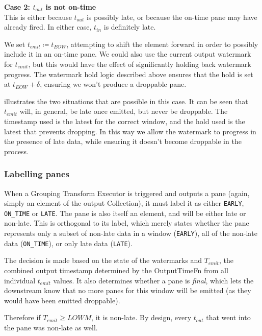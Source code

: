 \textbf{Case 2: $t_{\mathit{out}}$ is not on-time}\\
This is either because $t_{\mathit{out}}$ is possibly late, or because the on-time pane may have already fired.
In either case, $t_{\mathit{in}}$ is definitely late.

We set $t_{\mathit{emit}} \coloneq t_{\mathit{EOW}}$, attempting to shift the element forward in order to possibly include it in an on-time pane.
We could also use the current output watermark for $t_{\mathit{emit}}$, but this would have the effect of significantly holding back watermark progress.
The watermark hold logic described above ensures that the hold is set at $t_{\mathit{EOW}} + \delta$, ensuring we won't produce a droppable pane.


 illustrates the two situations that are possible in this case. It can be seen that $t_{\mathit{emit}}$ will, in general, be late once emitted, but never be droppable. 
The timestamp used is the latest for the correct window, and the hold used is the latest that prevents dropping.
In this way we allow the watermark to progress in the presence of late data, while ensuring it doesn't become droppable in the process.

\subsubsection{Labelling panes}

When a Grouping Transform Executor is triggered and outputs a pane (again, simply an element of the output Collection), it must label it as either \verb|EARLY|, \verb|ON_TIME| or \verb|LATE|.
The pane is also itself an element, and will be either late or non-late.
This is orthogonal to its label, which merely states whether the pane represents only a subset of non-late data in a window (\verb|EARLY|), all of the non-late data (\verb|ON_TIME|), or only late data (\verb|LATE|).

The decision is made based on the state of the watermarks and $T_{\mathit{emit}}$, the combined output timestamp determined by the OutputTimeFn from all individual $t_{\mathit{emit}}$ values.
It also determines whether a pane is \emph{final}, which lets the downstream know that no more panes for this window will be emitted (as they would have been emitted droppable).


Therefore if $T_{\mathit{emit}} \geq \mathit{LOWM}$, it is non-late.
By design, every $t_{\mathit{out}}$ that went into the pane was non-late as well.

